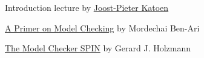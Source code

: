 \documentclass{article}
\begin{document}
\plush{}


\begin{pptWide}{2}
\par\columnbreak\par
{}
\end{pptWide}

\plush{}

Introduction lecture by \href{https://www.youtube.com/watch?v=VHWEldcSx14}{Joost-Pieter Katoen}

\href{https://spinroot.com/spin/Doc/p40-ben-ari.pdf}{A Primer on Model Checking} by Mordechai Ben-Ari

\href{http://spinroot.com/spin/Doc/ieee97.pdf}{The Model Checker SPIN} by Gerard J. Holzmann
\end{document}
